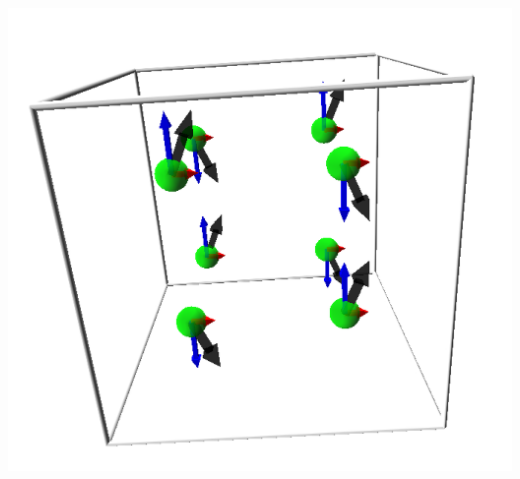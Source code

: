 \documentclass{article}
\begin{document}
\begin{center}
\includegraphics[scale=0.3]{fig02.png}
\end{center}
%
%


\end{document}
